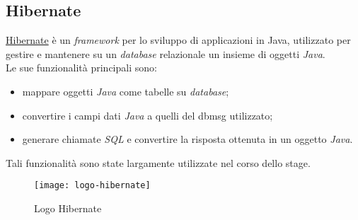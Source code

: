 \subsection{Hibernate}
\href{https://hibernate.org/}{Hibernate} è un \textit{framework} per lo sviluppo di applicazioni in Java, utilizzato per gestire e mantenere su un \textit{database} relazionale un insieme di oggetti \textit{Java}.
\\Le sue funzionalità principali sono:
\begin{itemize}
    \item mappare oggetti \textit{Java} come tabelle su \textit{database};
    \item convertire i campi dati \textit{Java} a quelli del \gls{dbmsg}\glsfirstoccur{}{} utilizzato;
    \item generare chiamate \textit{SQL} e convertire la risposta ottenuta in un oggetto \textit{Java}.
\end{itemize}
Tali funzionalità sono state largamente utilizzate nel corso dello stage.
\begin{figure}[h]
    \begin{center}
    \texttt{[image: logo-hibernate]}
    \caption{Logo Hibernate}
    \label{fig:figure5}
    \end{center}
\end{figure}

